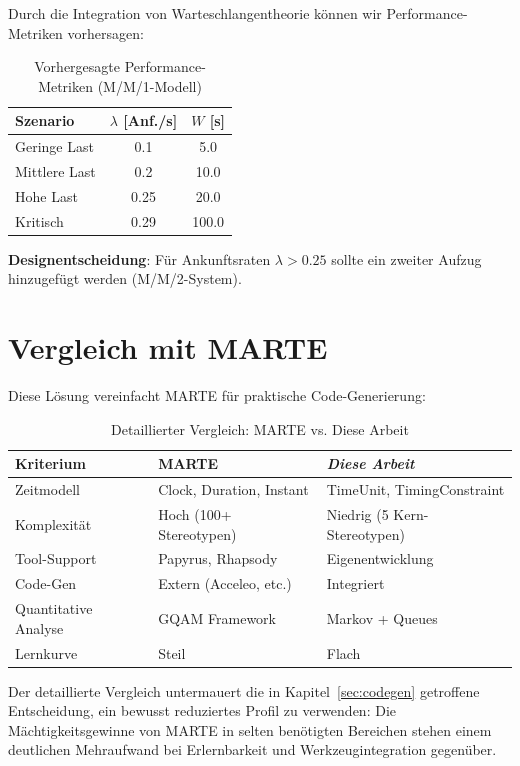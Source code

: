 ﻿\documentclass[a4paper,12pt]{report}
\theoremstyle{definition}
\begin{document}
Durch die Integration von Warteschlangentheorie können wir Performance-Metriken vorhersagen:

\begin{table}[h]
	\centering
	\begin{tabular}{@{}lcc@{}}
		\toprule
		\textbf{Szenario} & \textbf{$\lambda$ [Anf./s]} & \textbf{$W$ [s]} \\
		\midrule
		Geringe Last & 0.1 & 5.0 \\
		Mittlere Last & 0.2 & 10.0 \\
		Hohe Last & 0.25 & 20.0 \\
		Kritisch & 0.29 & 100.0 \\
		\bottomrule
	\end{tabular}
	\caption{Vorhergesagte Performance-Metriken (M/M/1-Modell)}
	\label{tab:performance-prediction}
\end{table}

\textbf{Designentscheidung}: Für Ankunftsraten $\lambda > 0.25$ sollte ein zweiter Aufzug hinzugefügt werden (M/M/2-System).

\section{Vergleich mit MARTE}

Diese Lösung vereinfacht MARTE für praktische Code-Generierung:

\begin{table}[h]
	\centering
	\begin{tabular}{@{}lll@{}}
		\toprule
		\textbf{Kriterium} & \textbf{MARTE} & \textbf{\textit{Diese Arbeit}} \\
		\midrule
		Zeitmodell & Clock, Duration, Instant & TimeUnit, TimingConstraint \\
		Komplexität & Hoch (100+ Stereotypen) & Niedrig (5 Kern-Stereotypen) \\
		Tool-Support & Papyrus, Rhapsody & Eigenentwicklung \\
		Code-Gen & Extern (Acceleo, etc.) & Integriert \\
		Quantitative Analyse & GQAM Framework & Markov + Queues \\
		Lernkurve & Steil & Flach \\
		\bottomrule
	\end{tabular}
	\caption{Detaillierter Vergleich: MARTE vs. Diese Arbeit}
\label{tab:marte-detail}
	\label{tab:marte-detailed}
\end{table}

Der detaillierte Vergleich untermauert die in Kapitel~\ref{sec:codegen} getroffene Entscheidung, ein bewusst reduziertes Profil zu verwenden: Die Mächtigkeitsgewinne von MARTE in selten benötigten Bereichen stehen einem deutlichen Mehraufwand bei Erlernbarkeit und Werkzeugintegration gegenüber.
\end{document}
